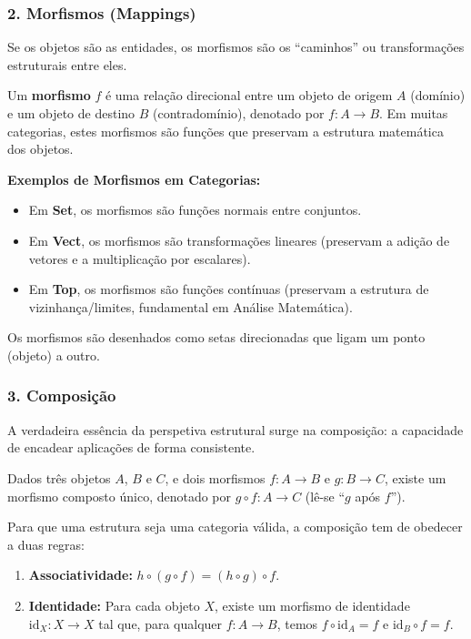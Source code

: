 \subsubsection*{2. Morfismos (Mappings)}

Se os objetos são as entidades, os morfismos são os ``caminhos'' ou transformações estruturais entre eles.

\begin{defbox}[title={Morfismo}]
  Um \textbf{morfismo} $f$ é uma relação direcional entre um objeto de origem $A$ (domínio) e um objeto de destino $B$ (contradomínio), denotado por $f: A \to B$. Em muitas categorias, estes morfismos são funções que preservam a estrutura matemática dos objetos.
\end{defbox}

\textbf{Exemplos de Morfismos em Categorias:}
\begin{itemize}
  \item Em \textbf{Set}, os morfismos são funções normais entre conjuntos.
  \item Em \textbf{Vect}, os morfismos são transformações lineares (preservam a adição de vetores e a multiplicação por escalares).
  \item Em \textbf{Top}, os morfismos são funções contínuas (preservam a estrutura de vizinhança/limites, fundamental em Análise Matemática).
\end{itemize}

\begin{notebox}[title={Interpretação Visual}]
  Os morfismos são desenhados como setas direcionadas que ligam um ponto (objeto) a outro.
\end{notebox}

\subsubsection*{3. Composição}

A verdadeira essência da perspetiva estrutural surge na composição: a capacidade de encadear aplicações de forma consistente.

\begin{defbox}[title={Composição e Axiomas da Categoria}]
  Dados três objetos $A$, $B$ e $C$, e dois morfismos $f: A \to B$ e $g: B \to C$, existe um morfismo composto único, denotado por $g \circ f: A \to C$ (lê-se ``$g$ após $f$''). 
  
  Para que uma estrutura seja uma categoria válida, a composição tem de obedecer a duas regras:
  \begin{enumerate}
      \item \textbf{Associatividade:} $h \circ (g \circ f) = (h \circ g) \circ f$.
      \item \textbf{Identidade:} Para cada objeto $X$, existe um morfismo de identidade $\text{id}_X: X \to X$ tal que, para qualquer $f: A \to B$, temos $f \circ \text{id}_A = f$ e $\text{id}_B \circ f = f$.
  \end{enumerate}
\end{defbox}


